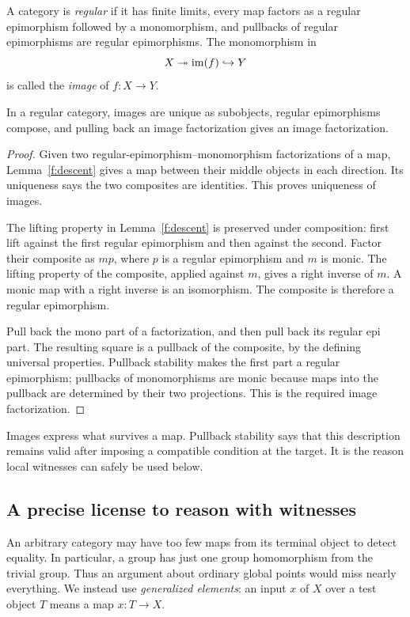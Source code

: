 \begin{definition}\label{f:regular}
A category is \emph{regular} if it has finite limits, every map factors
as a regular epimorphism followed by a monomorphism, and pullbacks of
regular epimorphisms are regular epimorphisms. The monomorphism in
\[
X\twoheadrightarrow \operatorname{im}(f)\hookrightarrow Y
\]
is called the \emph{image} of $f:X\to Y$.
\end{definition}

\begin{lemma}\label{f:images}
In a regular category, images are unique as subobjects, regular
epimorphisms compose, and pulling back an image factorization gives an
image factorization.
\end{lemma}
\begin{proof}
Given two regular-epimorphism--monomorphism factorizations of a map,
Lemma~\ref{f:descent} gives a map between their middle objects in each
direction. Its uniqueness says the two composites are identities.
This proves uniqueness of images.

The lifting property in Lemma~\ref{f:descent} is preserved under
composition: first lift against the first regular epimorphism and then
against the second. Factor their composite as $mp$, where $p$ is a
regular epimorphism and $m$ is monic. The lifting property of the
composite, applied against $m$, gives a right inverse of $m$. A monic
map with a right inverse is an isomorphism. The composite is therefore
a regular epimorphism.

Pull back the mono part of a factorization, and then pull back its
regular epi part. The resulting square is a pullback of the composite,
by the defining universal properties. Pullback stability makes the
first part a regular epimorphism; pullbacks of monomorphisms are monic
because maps into the pullback are determined by their two projections.
This is the required image factorization.
\end{proof}

Images express what survives a map. Pullback stability says that this
description remains valid after imposing a compatible condition at the
target. It is the reason local witnesses can safely be used below.

\subsection{A precise license to reason with witnesses}

An arbitrary category may have too few maps from its terminal object to
detect equality. In particular, a group has just one group homomorphism
from the trivial group. Thus an argument about ordinary global points
would miss nearly everything. We instead use \emph{generalized elements}:
an input $x$ of $X$ over a test object $T$ means a map $x:T\to X$.

